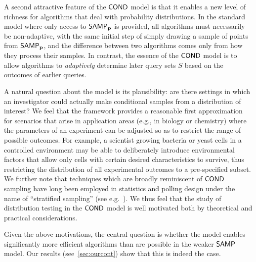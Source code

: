 A second attractive feature of the ${\sf COND}$ model is that it
enables a new level of richness for algorithms that deal with
probability distributions.  In the standard model where only access to
${\sf SAMP}_{\mathbf{p}}$ is provided, all algorithms must necessarily be non-adaptive,
with the same initial step of simply drawing a sample of points
from ${\sf SAMP}_{\mathbf{p}}$, and the difference between two algorithms comes only
from how they process their samples.  In contrast, the
essence of the ${\sf COND}$ model is to allow algorithms to \emph{adaptively}
determine later query sets $S$ based on the
outcomes of earlier queries.

A natural question about the \COND model is its plausibility:  are
there settings in which an investigator could actually make
conditional samples from a distribution of interest?  We feel that
the \COND framework provides a reasonable first approximation for scenarios
that arise in application areas (e.g., in biology or chemistry)
where the parameters of an experiment can be adjusted so as
to restrict the range of possible outcomes.  For example, a scientist
growing bacteria or yeast cells in a controlled environment may be
able to deliberately introduce environmental factors that allow only
cells with certain desired characteristics to survive,
thus restricting the distribution of all experimental
outcomes to a pre-specified subset.
We further note that techniques which are broadly reminiscent of ${\sf COND}$
sampling have long been employed in statistics and polling
design under the name of ``stratified sampling'' (see e.g.~\cite{wiki:13:stratifiedsampling,Neyman:34:stratifiedsampling}).  We thus feel that the study of distribution testing in
the ${\sf COND}$ model is well motivated both by theoretical and practical
considerations.

Given the above motivations, the central question is whether the
\COND model enables
significantly more efficient algorithms than are possible in the
weaker ${\sf SAMP}$ model.  Our
results (see~\cref{sec:ourcont}) show that this is indeed the case.


